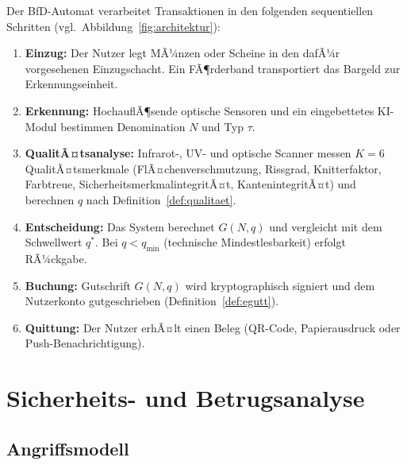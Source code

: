 ﻿\documentclass[a4paper,12pt]{article}
\theoremstyle{definition}
\begin{document}
Der BfD-Automat verarbeitet Transaktionen in den folgenden sequentiellen
Schritten (vgl.\ Abbildung~\ref{fig:architektur}):

\begin{enumerate}
  \item \textbf{Einzug:} Der Nutzer legt MÃ¼nzen oder Scheine in den dafÃ¼r vorgesehenen
        Einzugschacht.  Ein FÃ¶rderband transportiert das Bargeld zur Erkennungseinheit.
  \item \textbf{Erkennung:} HochauflÃ¶sende optische Sensoren und ein eingebettetes
        KI-Modul bestimmen Denomination $N$ und Typ $\tau$.
  \item \textbf{QualitÃ¤tsanalyse:} Infrarot-, UV- und optische Scanner messen
        $K = 6$ QualitÃ¤tsmerkmale (FlÃ¤chenverschmutzung, Rissgrad, Knitterfaktor,
        Farbtreue, SicherheitsmerkmalintegritÃ¤t, KantenintegritÃ¤t)
        und berechnen $q$ nach Definition~\ref{def:qualitaet}.
  \item \textbf{Entscheidung:} Das System berechnet $G(N,q)$ und vergleicht mit dem
        Schwellwert $q^*$.  Bei $q < q_{\min}$ (technische Mindestlesbarkeit) erfolgt
        RÃ¼ckgabe.
  \item \textbf{Buchung:} Gutschrift $G(N,q)$ wird kryptographisch signiert und
        dem Nutzerkonto gutgeschrieben (Definition~\ref{def:egutt}).
  \item \textbf{Quittung:} Der Nutzer erhÃ¤lt einen Beleg (QR-Code, Papierausdruck
        oder Push-Benachrichtigung).
\end{enumerate}

\section{Sicherheits- und Betrugsanalyse}
\label{sec:sicherheit}

\subsection{Angriffsmodell}
\end{document}
